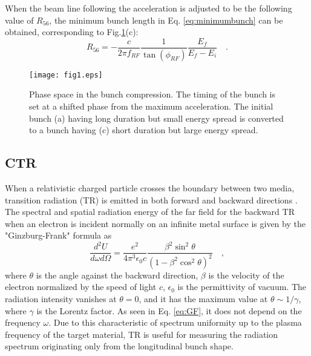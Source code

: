 \documentclass[review]{elsarticle}
\begin{document}
When the beam line following the acceleration
is adjusted to be the following value of $R_{56}$,
the minimum bunch length in Eq. \ref{eq:minimumbunch} can be obtained,
corresponding to Fig.\ref{fig:phasespace}(c):
%
\begin{equation}
R_{56} = - \frac{c}{2 \pi f_{RF}} \frac{1}{\tan(\phi_{RF})} \frac{E_f}{E_f-E_i} \quad .
\end{equation}

\begin{figure}[htb]
	\begin{center}
	 \texttt{[image: fig1.eps]}
	  \caption{
Phase space in the bunch compression.
The timing of the bunch is set at a shifted phase from the maximum acceleration.
The initial bunch (a) having long duration but small energy spread 
is converted to a bunch having (c) short duration but large energy spread.
}
	\label{fig:phasespace}
\end{center}
\end{figure}


\subsection{CTR}

When a relativistic charged particle
crosses the boundary between two media,
transition radiation (TR) is emitted in both forward and backward directions \cite{Happek}.
The spectral and spatial radiation energy 
of the far field for the backward TR
when an electron is incident normally on an infinite metal surface
is given by the "Ginzburg-Frank" formula \cite{Landau} as
\begin{equation}
\frac{d^ 2U}{d \omega d\Omega} = 
\frac{e^2}{4 \pi^3 \epsilon_0 c}
\frac{\beta ^2 \sin^2 \theta}{(1-\beta^2 \cos^2 \theta)^2}
\quad,
\label{eq:GF}
\end{equation}
where $\theta$ is the angle against the backward direction,
$\beta$ is the velocity of the electron normalized by the speed of light $c$,
$\epsilon_0$ is the permittivity of vacuum.
The radiation intensity vanishes at $\theta=0$,
and it has the maximum value at $\theta \sim 1/\gamma$,
where $\gamma$ is the Lorentz factor.
As seen in Eq. \ref{eq:GF},
it does not depend on the frequency $\omega$.
Due to this characteristic of 
spectrum uniformity
up to the plasma frequency of the target material,
TR is useful for measuring
the radiation spectrum originating only from the longitudinal bunch shape.
\end{document}
